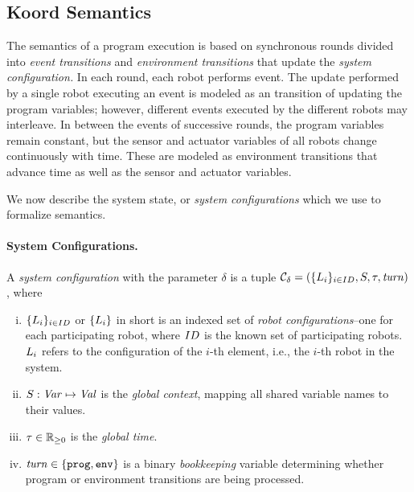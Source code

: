 \subsection{Koord Semantics}
\label{sec:configs}

The semantics of a \lgname program execution is based on synchronous rounds divided into {\em event transitions\/} and {\em environment transitions\/} that update the {\em system configuration.\/}
In each round, each robot performs  event.
The update performed by a single robot executing an event is modeled as an transition of updating the program variables;
however, different events executed by the different robots may interleave.
In between the events of successive rounds, the program variables remain constant,
but the sensor and actuator variables of all robots change continuously with time.
These are modeled as environment transitions that advance time as well as the sensor and actuator variables.

We now describe the system state, or \emph{system configurations} which we use to formalize \lgname semantics.

\paragraph{System Configurations.}

A {\em system configuration\/} with the parameter $\delta$ is a tuple
$\mathcal{C}_\delta = (\{L_{i}\}_{i\in ID},{S},\tau,\mathit{turn})$, where

\begin{enumerate}[i)]
\item $\{L_{i}\}_{i\in ID}$ or $\{L_{i}\}$ in short is an indexed set of \emph{robot configurations}--one for each participating robot,
      where $ID$ is the known set of participating robots.
      $L_{i}$ refers to the configuration of the $i$-th element, i.e., the $i$-th robot in the system.
\item ${S} : \mathit{Var} \mapsto \mathit{Val}$ is the {\em global context\/}, mapping all shared variable names to their values.
\item $\tau\in \nnreals$ is the {\em global time\/}.
\item $\mathit{turn}\in\{\mathtt{prog},\mathtt{env}\}$ is a binary \emph{bookkeeping} variable determining whether  program or environment transitions are being processed.
\end{enumerate}


